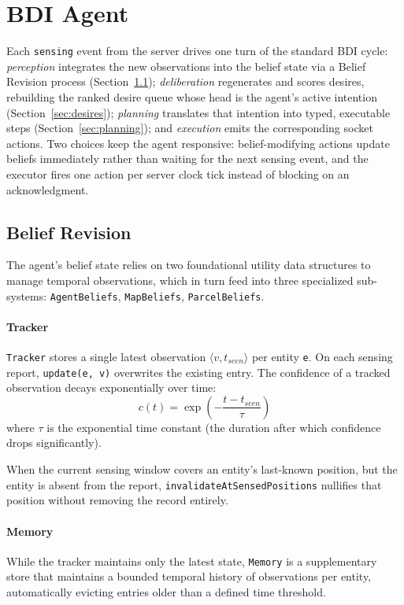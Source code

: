 \section{BDI Agent}
Each \texttt{sensing} event from the server drives one turn of the standard BDI cycle:
\emph{perception} integrates the new observations into the belief state via a Belief Revision process (Section~\ref{sec:belief});
\emph{deliberation} regenerates and scores desires, rebuilding the ranked desire queue whose head is the agent's active intention (Section~\ref{sec:desires});
\emph{planning} translates that intention into typed, executable steps (Section~\ref{sec:planning});
and \emph{execution} emits the corresponding socket actions.
Two choices keep the agent responsive: belief-modifying actions update beliefs immediately rather than waiting for the next sensing event,
and the executor fires one action per server clock tick instead of blocking on an acknowledgment.

\subsection{Belief Revision}
\label{sec:belief}
The agent's belief state relies on two foundational utility data structures to manage temporal observations,
which in turn feed into three specialized sub-systems: \texttt{AgentBeliefs}, \texttt{MapBeliefs}, \texttt{ParcelBeliefs}.

\paragraph{Tracker} \texttt{Tracker} stores a single latest observation $\langle v, t_{seen} \rangle$ per entity \texttt{e}.
On each sensing report, \texttt{update(e, v)} overwrites the existing entry.
The confidence of a tracked observation decays exponentially over time:
\begin{equation}
c(t) = \exp \left(-\frac{t - t_{seen}}{\tau}\right)
\label{eq:confidence}
\end{equation}
where $\tau$ is the exponential time constant (the duration after which confidence drops significantly).

When the current sensing window covers an entity's last-known position, but the entity is absent from the report,
\texttt{invalidateAtSensedPositions} nullifies that position without removing the record entirely.

\paragraph{Memory}
While the tracker maintains only the latest state, \texttt{Memory} is a supplementary store that maintains a bounded temporal history of observations per entity, automatically evicting entries older than a defined time threshold.

